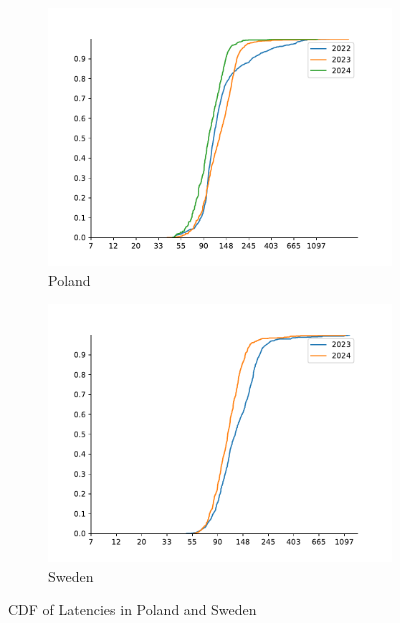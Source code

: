 \begin{figure}
	\centering
	\begin{subfigure}[b]{0.8\linewidth}
		\includegraphics[width=\linewidth]{chapters/4-results/latency/img/cdf_latencies_of_starlink_probes_in_poland.pdf}
		\caption{Poland}
	\end{subfigure}
	\begin{subfigure}[b]{0.8\linewidth}
		\includegraphics[width=\linewidth]{chapters/4-results/latency/img/cdf_latencies_of_starlink_probes_in_sweden.pdf}
		\caption{Sweden}
	\end{subfigure}
	\caption{CDF of Latencies in Poland and Sweden}
	\label{fig:latency-cdf-5}
\end{figure}


